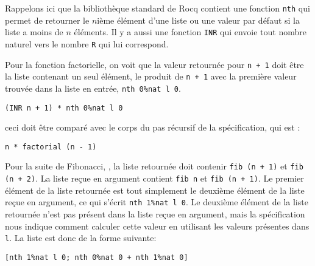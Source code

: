 \documentclass{modjflart}
\begin{document}
Rappelons ici que la bibliothèque standard de Rocq contient une
fonction \texttt{nth} qui permet de retourner le \(n\)ième élément d'une
liste ou une valeur par défaut si la liste a moins de \(n\) éléments.  Il
y a aussi une fonction \texttt{INR} qui envoie tout nombre naturel vers
le nombre \texttt{R} qui lui correspond.

Pour la fonction factorielle, on voit que la valeur retournée pour
\texttt{n + 1} doit être la liste contenant un seul élément,
le produit de \texttt{n + 1} avec
la première valeur trouvée dans la liste en entrée, \texttt{nth 0\%nat l 0}.
\begin{verbatim}
(INR n + 1) * nth 0%nat l 0
\end{verbatim}
ceci doit être comparé avec le corps du pas récursif de la
spécification, qui est :
\begin{verbatim}
n * factorial (n - 1)
\end{verbatim}

Pour la suite de Fibonacci, , la liste retournée doit
contenir \texttt{fib (n + 1)} et \texttt{fib (n + 2)}.
La liste reçue en argument contient \texttt{fib
    n} et \texttt{fib (n + 1)}.  Le premier
élément de la liste retournée est tout simplement le deuxième élément
de la liste reçue en argument, ce qui s'écrit \texttt{nth 1\%nat l 0}.
Le deuxième élément de la liste retournée n'est pas présent dans la
liste reçue en argument, mais la spécification nous indique comment
calculer cette valeur en utilisant les valeurs présentes dans \texttt{l}.
La liste est donc de la forme suivante:
\begin{verbatim}
[nth 1%nat l 0; nth 0%nat 0 + nth 1%nat 0]
\end{verbatim}
\end{document}
